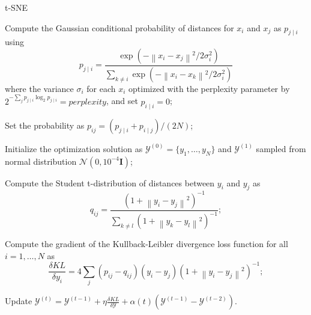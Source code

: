 \documentclass[11pt,a4paper,]{article}
\begin{document}
\begin{algorithm}[!htb]
  \caption{t-SNE}
  \label{alg:tsne}
  \DontPrintSemicolon
  \SetAlgoLined
  \BlankLine
  \begin{algorithmic}[1]

  \STATE Compute the Gaussian conditional probability of distances for $x_i$ and $x_j$ as $p_{j \mid i}$ using
  $$
    p_{j \mid i}=\frac{\exp \left(-\left\|x_{i}-x_{j}\right\|^{2} / 2 \sigma_{i}^{2}\right)}{\sum_{k \neq i} \exp \left(-\left\|x_{i}-x_{k}\right\|^{2} / 2 \sigma_{i}^{2}\right)}
  $$
  where the variance $\sigma_{i}$ for each $x_i$ optimized with the perplexity parameter by $ 2 ^ {-\sum_j{p_{j \mid i} \log_2{p_{j \mid i}}}} = \textit{perplexity} $, and set $p_{i \mid i}=0$;

  \STATE Set the probability as $p_{i j}=(p_{j \mid i}+p_{i \mid j}) / (2 N)$;

  \STATE Initialize the optimization solution as $\mathcal{Y}^{(0)} = \{ y_1, \dots, y_N \}$ and $\mathcal{Y}^{(1)}$ sampled from normal distribution $\mathcal{N}(0, 10^{-4} \boldsymbol{I})$;


  \STATE Compute the Student t-distribution of distances between $y_i$ and $y_j$ as 
  $$
    q_{i j}=\frac{\left(1+\left\|y_{i}-y_{j}\right\|^{2}\right)^{-1}}{\sum_{k \neq l}\left(1+\left\|y_{k}-y_{l}\right\|^{2}\right)^{-1}};
  $$

  \STATE Compute the gradient of the Kullback-Leibler divergence loss function for all $i=1,\ldots,N$ as
  $$
    \frac{\delta KL}{\delta y_{i}}=4 \sum_{j}\left(p_{i j}-q_{i j}\right)\left(y_{i}-y_{j}\right)\left(1+\left\|y_{i}-y_{j}\right\|^{2}\right)^{-1} ;
  $$

  \STATE Update $ \mathcal{Y}^{(t)}=\mathcal{Y}^{(t-1)} + \eta \frac{\delta KL}{\delta \mathcal{Y}} + \alpha(t)\left(\mathcal{Y}^{(t-1)}-\mathcal{Y}^{(t-2)}\right). $

  \ENDFOR

  \end{algorithmic}
\end{algorithm}
\end{document}
